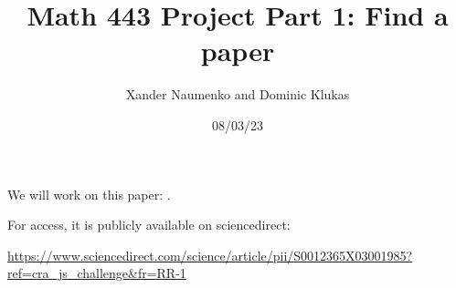 \documentclass[letterpaper, reqno,11pt]{article}
\begin{document}
\title{Math 443 Project Part 1: Find a paper}
\date{08/03/23}
\author{Xander Naumenko and Dominic Klukas}
\maketitle

We will work on this paper: \cite{MR2009550}. 

For access, it is publicly available on sciencedirect: 

\href{https://www.sciencedirect.com/science/article/pii/S0012365X03001985?ref=cra_js_challenge&fr=RR-1}{https://www.sciencedirect.com/science/article/pii/S0012365X03001985?ref=cra_js_challenge&fr=RR-1}

\printbibliography
\end{document}
